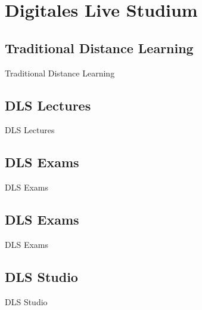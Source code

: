%
%

\pagebreak
\section{Digitales Live Studium}

\onehalfspacing

\subsection{Traditional Distance Learning}

Traditional Distance Learning

\subsection{DLS Lectures}

DLS Lectures

\subsection{DLS Exams}

DLS Exams

\subsection{DLS Exams}

DLS Exams

\subsection{DLS Studio}

DLS Studio
